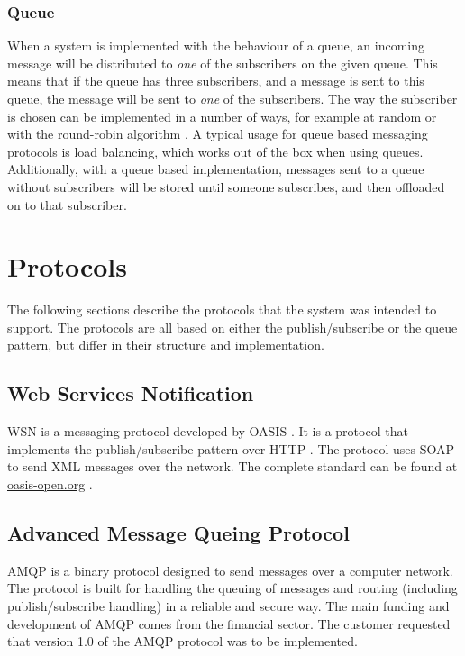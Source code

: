 \subsubsection{Queue}
When a system is implemented with the behaviour of a queue, an incoming message will be distributed to \textit{one} of the subscribers on the given queue. This means that if the queue has three subscribers, and a message is sent to this queue, the message will be sent to \textit{one} of the subscribers. The way the subscriber is chosen can be implemented in a number of ways, for example at random or with the round-robin algorithm \cite{round-robin}. A typical usage for queue based messaging protocols is load balancing, which works out of the box when using queues. Additionally, with a queue based implementation, messages sent to a queue without subscribers will be stored until someone subscribes, and then offloaded on to that subscriber.

\section{Protocols}
\label{prestudies-protocols}

The following sections describe the protocols that the system was intended to support. The protocols are all based on either the publish/subscribe or the queue pattern, but differ in their structure and implementation.

\subsection{Web Services Notification}
\label{subsec:prestudies-wsnotification}

WSN is a messaging protocol developed by OASIS \cite{oasis}. It is a protocol that implements the publish/subscribe pattern over HTTP \cite{http}. The protocol uses SOAP \cite{soap} to send XML \cite{xml} messages over the network. The complete standard can be found at \url{oasis-open.org} \cite{wsn-basenotification}.

\subsection{Advanced Message Queing Protocol}
\label{subsec:prestudies-amqp}
AMQP is a binary protocol designed to send messages over a computer network. The protocol is built for handling the queuing of messages and routing (including publish/subscribe handling) in a reliable and secure way. The main funding and development of AMQP comes from the financial sector. The customer requested that version 1.0 of the AMQP protocol was to be implemented.

